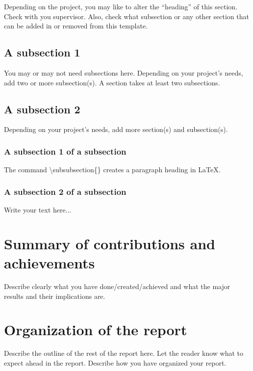 Depending on the project, you may like to alter the ``heading'' of
this section. Check with you supervisor. Also, check what subsection
or any other section that can be added in or removed from this template.

\subsection{A subsection 1}
\label{sec:intro_some_sub1}
You may or may not need subsections here. Depending on your project's
needs, add two or more subsection(s). A section takes at least two
subsections.

\subsection{A subsection 2}
\label{sec:intro_some_sub2}
Depending on your project's needs, add more section(s) and subsection(s).

\subsubsection{A subsection 1 of a subsection}
\label{sec:intro_some_subsub1}
The command \textbackslash subsubsection\{\} creates a paragraph
heading in \LaTeX.

\subsubsection{A subsection 2 of a subsection}
\label{sec:intro_some_subsub2}
Write your text here...

\section{Summary of contributions and achievements} %
\label{sec:intro_sum_results} %
Describe clearly what you have done/created/achieved and what the
major results and their implications are.

\section{Organization of the report} %
\label{sec:intro_org} %
Describe the outline of the rest of the report here. Let the reader
know what to expect ahead in the report. Describe how you have
organized your report.

